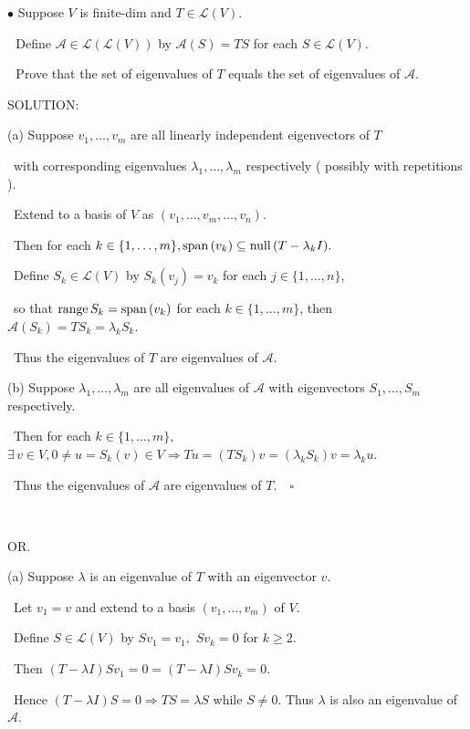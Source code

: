 \documentclass[a4paper, 11pt, UTF8]{article}
\def\range{\textup{range}\,}
\def\null{\textup{null\,}}
\def\Spn{\textup{span}\,}
\def\Lm{\mathcal{L}}
\begin{document}
\begin{large}
{\small $\bullet$} {\timessl\Large 
Suppose $V$ is finite-dim and $T\in\Lm(V)$.}\par\,\,
{\timessl\Large Define $\mathcal{A}\in\Lm(\Lm(V))$ by $\mathcal{A}(S) = TS$ for each $S\in\Lm(V)$.}\par\,\,
{\timessl\Large Prove that the set of eigenvalues of $T$ equals the set of eigenvalues of $\mathcal{A}$.
}\par
{\timesbf S\footnotesize{OLUTION:}}\par\quad
(a) Suppose $v_1,\dots,v_m$ are all linearly independent eigenvectors of $T$\par\qquad\,
with corresponding eigenvalues $\lambda_1,\dots,\lambda_m$ respectively ( possibly with repetitions ).\par\qquad\,
Extend to a basis of $V$ as $(v_1,\dots,v_m,\dots,v_n).$\par\qquad\,
Then for each $k\in\{1,\dots,m\},\Spn(v_k)\subseteq\null(T-\lambda_k I).$\par\qquad\,
Define $S_k\in\Lm(V)$ by $S_k(v_j)=v_k$ for each $j\in\{1,\dots,n\}$,\par\qquad\qquad\quad\,
so that $\range S_k=\Spn(v_k)$ for each $k\in\{1,\dots,m\}$, then $\mathcal{A}(S_k)=TS_k=\lambda_k S_k.$\par\qquad\,
Thus the eigenvalues of $T$ are eigenvalues of $\mathcal{A}.$\par\quad
(b) Suppose $\lambda_1,\dots,\lambda_m$ are all eigenvalues of $\mathcal{A}$ with eigenvectors $S_1,\dots,S_m$ respectively.\par\qquad\,
Then for each $k\in\{1,\dots,m\},$ $\exists\,v\in V,0\neq u=S_k(v)\in V\Rightarrow Tu=(TS_k) v=(\lambda_k S_k) v=\lambda_k u.$\par\qquad\,
Thus the eigenvalues of $\mathcal{A}$ are eigenvalues of $T.\quad\square$\par{\tiny\,\par}\quad
O{\small R.} \par\quad
(a) Suppose $\lambda$ is an eigenvalue of $T$ with an eigenvector $v.$\par\qquad\,
Let $v_1=v$ and extend to a basis $(v_1,\dots,v_m)$ of $V.$\par\qquad\,
Define $S\in\Lm(V)$ by $Sv_1=v_1,\,\,Sv_k=0$ for $k\geq 2.$\par\qquad\,
Then $(T-\lambda I)Sv_1=0=(T-\lambda I)Sv_k=0.$\par\qquad\,
Hence $(T-\lambda I)S=0\Rightarrow TS=\lambda S$ while $S\neq 0.$ Thus $\lambda$ is also an eigenvalue of $\mathcal{A}.$\par\quad

\end{large}
\end{document}
